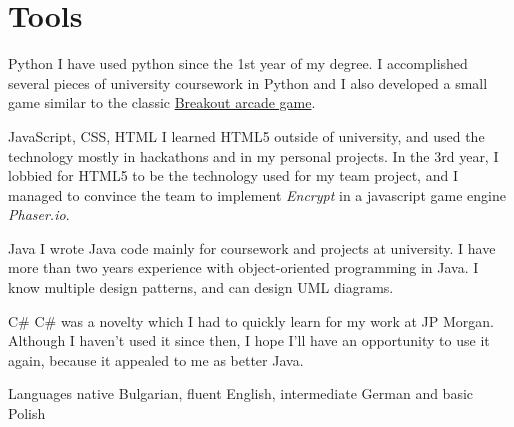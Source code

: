 \documentclass{tccv}
\begin{document}
\section{Tools}

\begin{skillist}

\item{Python} {I have used python since the 1st year of my degree. I accomplished several pieces of university coursework in Python and I also developed a small game similar to the classic \href{http://en.wikipedia.org/wiki/Breakout_(video_game)}{Breakout arcade game}.}

\item{JavaScript, CSS, HTML} {I learned HTML5 outside of university, and used the technology mostly in hackathons and in my personal projects. In the 3rd year, I lobbied for HTML5 to be the technology used for my team project, and I managed to convince the team to implement \textit{Encrypt} in a javascript game engine \textit{Phaser.io}.}

\item{Java}
{I wrote Java code mainly for coursework and projects at university. I have more than two years experience with object-oriented programming in Java. I know multiple design patterns, and can design UML diagrams.}
 

\item{C\#}
{C\# was a novelty which I had to quickly learn for my work at JP Morgan. Although I haven't used it since then, I hope I'll have an opportunity to use it again, because it appealed to me as better Java.}

\item {Languages } {native Bulgarian, fluent English, intermediate German and basic Polish}
\end{skillist}
\end{document}
